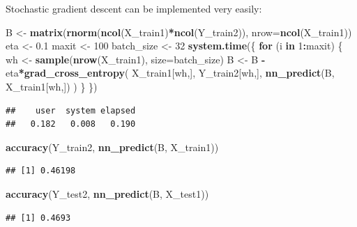 \documentclass[10pt,b5paper,krantz1]{krantz}
\newenvironment{Shaded}{\begin{snugshade}}{\end{snugshade}}
\newcommand{\ControlFlowTok}[1]{\textcolor[rgb]{0.27,0.27,0.27}{\textbf{#1}}}
\newcommand{\DataTypeTok}[1]{\textcolor[rgb]{0.27,0.27,0.27}{#1}}
\newcommand{\DecValTok}[1]{\textcolor[rgb]{0.06,0.06,0.06}{#1}}
\newcommand{\FloatTok}[1]{\textcolor[rgb]{0.06,0.06,0.06}{#1}}
\newcommand{\KeywordTok}[1]{\textcolor[rgb]{0.27,0.27,0.27}{\textbf{#1}}}
\newcommand{\NormalTok}[1]{#1}
\newcommand{\OperatorTok}[1]{\textcolor[rgb]{0.43,0.43,0.43}{\textbf{#1}}}
\newcommand{\StringTok}[1]{\textcolor[rgb]{0.5,0.5,0.5}{#1}}
\begin{document}
Stochastic gradient descent can be implemented very easily:

\begin{Shaded}
\begin{Highlighting}[]
\NormalTok{B <-}\StringTok{ }\KeywordTok{matrix}\NormalTok{(}\KeywordTok{rnorm}\NormalTok{(}\KeywordTok{ncol}\NormalTok{(X_train1)}\OperatorTok{*}\KeywordTok{ncol}\NormalTok{(Y_train2)),}
    \DataTypeTok{nrow=}\KeywordTok{ncol}\NormalTok{(X_train1))}
\NormalTok{eta <-}\StringTok{ }\FloatTok{0.1}
\NormalTok{maxit <-}\StringTok{ }\DecValTok{100}
\NormalTok{batch_size <-}\StringTok{ }\DecValTok{32}
\KeywordTok{system.time}\NormalTok{(\{}
    \ControlFlowTok{for}\NormalTok{ (i }\ControlFlowTok{in} \DecValTok{1}\OperatorTok{:}\NormalTok{maxit) \{}
\NormalTok{        wh <-}\StringTok{ }\KeywordTok{sample}\NormalTok{(}\KeywordTok{nrow}\NormalTok{(X_train1), }\DataTypeTok{size=}\NormalTok{batch_size)}
\NormalTok{        B <-}\StringTok{ }\NormalTok{B }\OperatorTok{-}\StringTok{ }\NormalTok{eta}\OperatorTok{*}\KeywordTok{grad_cross_entropy}\NormalTok{(}
\NormalTok{            X_train1[wh,], Y_train2[wh,],}
            \KeywordTok{nn_predict}\NormalTok{(B, X_train1[wh,])}
\NormalTok{        )}
\NormalTok{    \}}
\NormalTok{\})}
\end{Highlighting}
\end{Shaded}

\begin{verbatim}
##    user  system elapsed 
##   0.182   0.008   0.190
\end{verbatim}

\begin{Shaded}
\begin{Highlighting}[]
\KeywordTok{accuracy}\NormalTok{(Y_train2, }\KeywordTok{nn_predict}\NormalTok{(B, X_train1))}
\end{Highlighting}
\end{Shaded}

\begin{verbatim}
## [1] 0.46198
\end{verbatim}

\begin{Shaded}
\begin{Highlighting}[]
\KeywordTok{accuracy}\NormalTok{(Y_test2,  }\KeywordTok{nn_predict}\NormalTok{(B, X_test1))}
\end{Highlighting}
\end{Shaded}

\begin{verbatim}
## [1] 0.4693
\end{verbatim}
\end{document}
